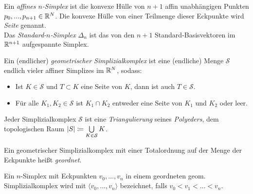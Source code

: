 \documentclass{cheat-sheet}
\newcommand{\angles}[1]{\langle #1 \rangle}
\newcommand{\Simpl}{\mathcal{S}} %
\newcommand{\Real}[1]{\abs{#1}} %
\begin{document}






\begin{defn}
  Ein \emph{affines $n$-Simplex} ist die konvexe Hülle von $n+1$ affin unabhängigen Punkten $p_0, ..., p_{n+1} \in \mathbb{R}^N$. Die konvexe Hülle von einer Teilmenge dieser Eckpunkte wird \emph{Seite} genannt.\\
  Das \emph{Standard-$n$-Simplex} $\Delta_n$ ist das von den $n+1$ Standard-Basisvektoren im $\mathbb{R}^{n+1}$ aufgespannte Simplex.
\end{defn}

\begin{defn}
  Ein (endlicher) \emph{geometrischer Simplizialkomplex} ist eine (endliche) Menge $\mathcal{S}$ endlich vieler affiner Simplizes im $\mathbb{R}^N$, sodass:
  \begin{itemize}
    \item Ist $K \in \Simpl$ und $T \subset K$ eine Seite von $K$, dann ist auch $T \in \Simpl$.
    \item Für alle $K_1, K_2 \in \Simpl$ ist $K_1 \cap K_2$ entweder eine Seite von $K_1$ und $K_2$ oder leer.
  \end{itemize}
\end{defn}

\begin{defn}
  Jeder Simplizialkomplex $\Simpl$ ist eine \emph{Triangulierung} seines \emph{Polyeders}, dem topologischen Raum $\Real{S} \coloneqq \bigcup_{K \in \Simpl} K$.
\end{defn}

\begin{defn}
  Ein geometrischer Simplizialkomplex mit einer Totalordnung auf der Menge der Eckpunkte heißt \emph{geordnet}.
\end{defn}

\begin{nota}
  Ein $n$-Simplex mit Eckpunkten $v_0, ..., v_n$ in einem geordneten geom. Simplizialkomplex wird mit $\angles{v_0, ..., v_n}$ bezeichnet, falls $v_0 < v_1 < ... < v_n$.
\end{nota}
\end{document}
